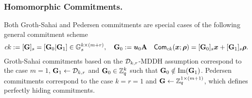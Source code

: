 \subsubsection{Homomorphic Commitments.}
Both Groth-Sahai and Pedersen commitments are special cases of the following general commitment scheme
\begin{align*}
&ck:=[\mathbf{{G}}]_s=[\mathbf{{G}}_0|\mathbf{{G}}_1]\in\mathbb{G}_s^{k\times (m+r)}, \quad \mathbf{{G}}_0 :={\boldsymbol{u}}_0\mathbf{{A}}
& \mathsf{Com}_{ck}({\boldsymbol{x}};{\boldsymbol{\rho}})=[\mathbf{{G}}_0]_s{\boldsymbol{x}}+[\mathbf{{G}}_1]_s{\boldsymbol{\rho}}.
\end{align*}
Groth-Sahai commitments based on the $\mathcal{D}_{k,r}$-MDDH assumption correspond to the case $m=1$, $\mathbf{{G}}_1\gets\mathcal{D}_{k,r}$ and $\mathbf{{G}}_0\in\mathbb{Z}_q^k$ such that $\mathbf{{G}}_0\notin\mathrm{Im}(\mathbf{{G}}_1)$. Pedersen commitments correspond to the case $k=r=1$ and $\mathbf{{G}}\gets\mathbb{Z}_q^{1\times(m+1)}$, which defines perfectly hiding commitments.

